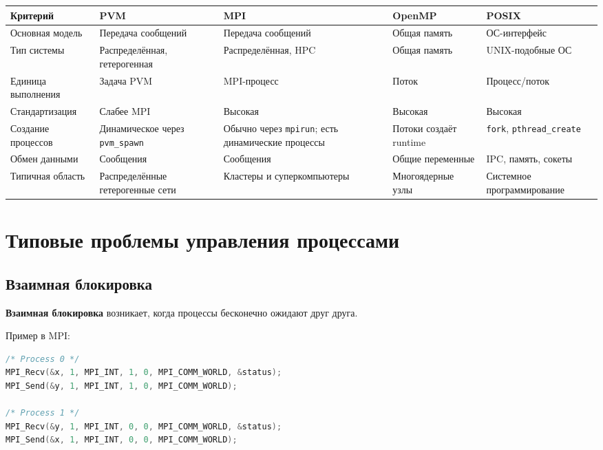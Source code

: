 \documentclass[12pt,a4paper]{article}
\begin{document}
\begin{center}
\begin{tabular}{|p{3cm}|p{3cm}|p{3cm}|p{3cm}|p{3cm}|}
\hline
\textbf{Критерий} & \textbf{PVM} & \textbf{MPI} & \textbf{OpenMP} & \textbf{POSIX} \\
\hline
Основная модель & Передача сообщений & Передача сообщений & Общая память & ОС-интерфейс \\
\hline
Тип системы & Распределённая, гетерогенная & Распределённая, HPC & Общая память & UNIX-подобные ОС \\
\hline
Единица выполнения & Задача PVM & MPI-процесс & Поток & Процесс/поток \\
\hline
Стандартизация & Слабее MPI & Высокая & Высокая & Высокая \\
\hline
Создание процессов & Динамическое через \texttt{pvm\_spawn} & Обычно через \texttt{mpirun}; есть динамические процессы & Потоки создаёт runtime & \texttt{fork}, \texttt{pthread\_create} \\
\hline
Обмен данными & Сообщения & Сообщения & Общие переменные & IPC, память, сокеты \\
\hline
Типичная область & Распределённые гетерогенные сети & Кластеры и суперкомпьютеры & Многоядерные узлы & Системное программирование \\
\hline
\end{tabular}
\end{center}

\section{Типовые проблемы управления процессами}

\subsection{Взаимная блокировка}

\textbf{Взаимная блокировка} возникает, когда процессы бесконечно ожидают друг друга.

Пример в MPI:

\begin{lstlisting}[language=C]
/* Process 0 */
MPI_Recv(&x, 1, MPI_INT, 1, 0, MPI_COMM_WORLD, &status);
MPI_Send(&y, 1, MPI_INT, 1, 0, MPI_COMM_WORLD);

/* Process 1 */
MPI_Recv(&y, 1, MPI_INT, 0, 0, MPI_COMM_WORLD, &status);
MPI_Send(&x, 1, MPI_INT, 0, 0, MPI_COMM_WORLD);
\end{lstlisting}
\end{document}
